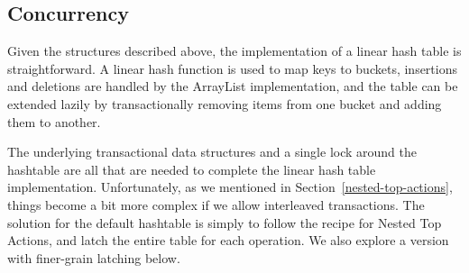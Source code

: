 \documentclass[10pt,letterpaper,twocolumn,english]{article}
\newcommand{\yad}{LLADD\xspace}
\begin{document}
\subsection{Concurrency}

Given the structures described above, the implementation of a linear
hash table is straightforward.  A linear hash function is used to map
keys to buckets, insertions and deletions are handled by the ArrayList
implementation, and the table can be extended lazily by
transactionally removing items from one bucket and adding them to
another.  

The underlying transactional data structures and a
single lock around the hashtable are all that are needed
to complete the linear hash table implementation.  Unfortunately, as
we mentioned in Section~\ref{nested-top-actions}, things become a bit
more complex if we allow interleaved transactions.  The solution for
the default hashtable is simply to follow the recipe for Nested
Top Actions, and latch the entire table for each operation.
We also explore a version with finer-grain latching below.
\end{document}
